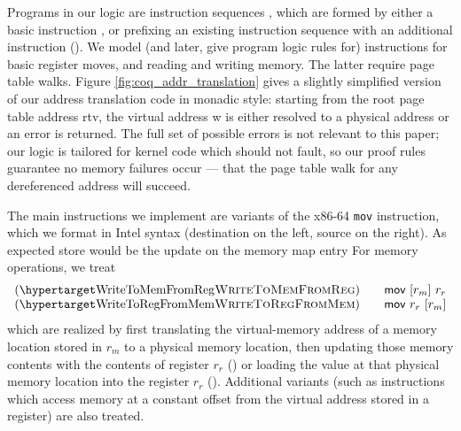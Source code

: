 Programs in our logic are instruction sequences \instrs, which are formed by either a basic instruction \iskip, or prefixing an existing instruction
sequence with an additional instruction (\iseq\instr\instrs).
We model (and later, give program logic rules for) instructions for basic register moves, and reading and writing memory.
The latter require page table walks.
Figure \ref{fig:coq_addr_translation} gives a slightly simplified version of our address translation code in monadic style:
starting from the root page table address \textsf{rtv}, the virtual address \textsf{w} is either resolved to a physical address or an error is returned.
The full set of possible errors is not relevant to this paper; our logic is tailored for kernel code which should not fault,
so our proof rules guarantee no memory failures occur --- that the page table walk for any dereferenced address will succeed.


The main instructions we implement are variants of the x86-64 \lstinline|mov| instruction, which we format in Intel syntax (destination on the left, source on the right).
As expected \textsf{store} would be the update on the memory map entry
For memory operations, we treat
\[
\begin{array}{l}
  \hbox{(\TirNameStyle{WriteToMemFromReg})} \qquad
  \textsf{mov}~[r_m]~r_r \\
  \hbox{(\TirNameStyle{WriteToRegFromMem})} \qquad 
  \textsf{mov}~r_r~[r_m]
  \end{array}
  \]
which are realized by first translating the virtual-memory address of a memory location stored in $r_m$ to a physical memory location,
then updating those memory contents with the contents of register $r_r$ () 
or loading the value at that physical memory location into the register $r_r$
(). 
Additional variants (such as instructions which access memory at a constant offset from the virtual address stored in a register) are also treated.

